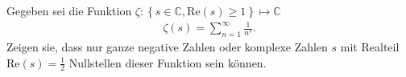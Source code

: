 Gegeben sei die Funktion $\zeta: \left\lbrace s \in \mathbb{C}, \text{Re}(s) \geq 1 \right\rbrace \mapsto \mathbb{C}$
\begin{align*}
    \zeta(s) = \sum_{n= 1}^{\infty} \frac{1}{n^s}. 
\end{align*}
Zeigen sie, dass nur ganze negative Zahlen oder komplexe Zahlen $s$ mit Realteil $\text{Re}(s) = \frac{1}{2}$ Nullstellen dieser Funktion sein können. 
